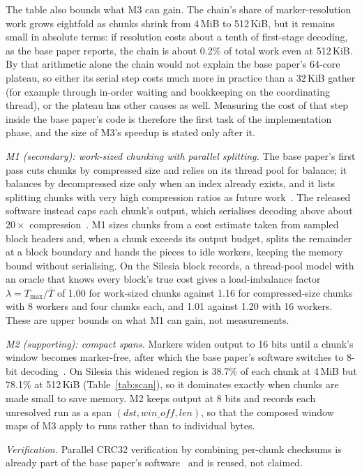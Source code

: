 \documentclass[conference]{IEEEtran}
\begin{document}
The table also bounds what M3 can gain. The chain's share of marker-resolution
work grows eightfold as chunks shrink from 4\,MiB to 512\,KiB, but it remains
small in absolute terms: if resolution costs about a tenth of first-stage
decoding, as the base paper reports, the chain is about 0.2\% of total work even
at 512\,KiB. By that arithmetic alone the chain would not explain the base
paper's 64-core plateau, so either its serial step costs much more in practice
than a 32\,KiB gather (for example through in-order waiting and bookkeeping on
the coordinating thread), or the plateau has other causes as well. Measuring the
cost of that step inside the base paper's code is therefore the first task of
the implementation phase, and the size of M3's speedup is stated only after it.

\emph{M1 (secondary): work-sized chunking with parallel splitting.} The base
paper's first pass cuts chunks by compressed size and relies on its thread pool
for balance; it balances by decompressed size only when an index already exists,
and it lists splitting chunks with very high compression ratios as future
work~\cite{rapidgzip}. The released software instead caps each chunk's output,
which serialises decoding above about $20\times$ compression~\cite{changelog}.
M1 sizes chunks from a cost estimate taken from sampled block headers and, when
a chunk exceeds its output budget, splits the remainder at a block boundary and
hands the pieces to idle workers, keeping the memory bound without serialising.
On the Silesia block records, a thread-pool model with an oracle that knows every
block's true cost gives a load-imbalance factor $\lambda = T_{\max}/\bar{T}$ of
1.00 for work-sized chunks against 1.16 for compressed-size chunks with 8 workers
and four chunks each, and 1.01 against 1.20 with 16 workers. These are upper
bounds on what M1 can gain, not measurements.

\emph{M2 (supporting): compact spans.} Markers widen output to 16 bits until a
chunk's window becomes marker-free, after which the base paper's software
switches to 8-bit decoding~\cite{rapidgzip}. On Silesia this widened region is
38.7\% of each chunk at 4\,MiB but 78.1\% at 512\,KiB (Table~\ref{tab:scan}), so
it dominates exactly when chunks are made small to save memory. M2 keeps output
at 8 bits and records each unresolved run as a span
$(\textit{dst}, \textit{win\_off}, \textit{len})$, so that the composed window maps
of M3 apply to runs rather than to individual bytes.

\emph{Verification.} Parallel CRC32 verification by combining per-chunk checksums
is already part of the base paper's software~\cite{changelog} and is reused, not
claimed.
\end{document}
